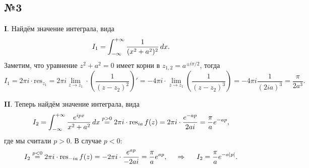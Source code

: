  \subsection*{№3}


 \textbf{I}. Найдём значение интеграла, вида
 \begin{equation*}
     I_1= \int_{-\infty}^{+\infty} \frac{1}{(x^2 + a^2)^2} \, d x.
 \end{equation*}
 Заметим, что уравнение $z^2 + a^2 = 0$ имеет корни в $z_{1, 2} = a^{\pm i \pi/2}$, тогда
 \begin{equation*}
     I_1 = 2 \pi i \cdot \text{res}_{z_1} = 2 \pi i 
     \lim_{z \to z_1} \cdot \left(
        \frac{1}{(z- z_2)^2}
     \right)' = -4 \pi i \cdot \lim_{z \to z_1} \left(
        \frac{1}{(z-z_2)^3}
     \right) = - 4 \pi i \frac{1}{(2 i a)^3} = \frac{\pi}{2 a^3}.
 \end{equation*}


\textbf{II}.  Теперь найдём значение интеграла, вида
\begin{equation*}
    I_2 = \int_{-\infty}^{+\infty}  \frac{e^{i p x}}{x^2 + a^2} \, d x \overset{p>0}{=} 
    2 \pi i \cdot \mathop{\mathrm{res}}\nolimits_{ia} f(z) = 2 \pi i \cdot \frac{e^{- a p}}{2 a i} = \frac{\pi}{a} e^{-ap},
\end{equation*}
где мы считали $p>0$. В случае $p<0$:
\begin{equation*}
    I_2 \overset{p<0}{=}  2 \pi i \cdot \mathop{\mathrm{res}}\nolimits_{-ia} f(z) = -2 \pi i \cdot \frac{e^{ap}}{-2ai} = \frac{\pi}{a} e^{ap},
    \hspace{0.5cm} \Rightarrow \hspace{0.5cm}
    I_2 = \frac{\pi}{a}e^{- a |p|}.
\end{equation*}